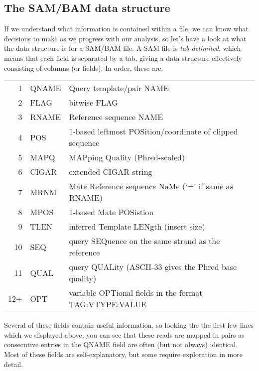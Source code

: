\subsection{The SAM/BAM data structure}
\begin{information}
If we understand what information is contained within a file, we can know what decisions to make as we progress with our analysis, so let's have a look at what the data structure is for a SAM/BAM file.
A SAM file is \textit{tab-delimited}, which means that each field is separated by a tab, giving a data structure effectively consisting of columns (or fields).
In order, these are: \\
\begin{tabular}{r l l}
1 & QNAME & Query template/pair NAME \\
2 & FLAG & bitwise FLAG \\
3 & RNAME & Reference sequence NAME \\
4 & POS & 1-based leftmost POSition/coordinate of clipped sequence \\
5 & MAPQ & MAPping Quality (Phred-scaled) \\
6 & CIGAR & extended CIGAR string \\
7 & MRNM & Mate Reference sequence NaMe (`=' if same as RNAME) \\
8 & MPOS & 1-based Mate POSistion \\
9 & TLEN & inferred Template LENgth (insert size) \\
10 & SEQ & query SEQuence on the same strand as the reference \\
11 & QUAL & query QUALity (ASCII-33 gives the Phred base quality) \\
12+ & OPT & variable OPTional fields in the format TAG:VTYPE:VALUE \\
\end{tabular}
\end{information}

\begin{note}
Several of these fields contain useful information, so looking the the first few lines which we displayed above, you can see that these reads are mapped in pairs as consecutive entries in the QNAME field are often (but not always) identical.
Most of these fields are self-explanatory, but some require exploration in more detail.
\end{note}

